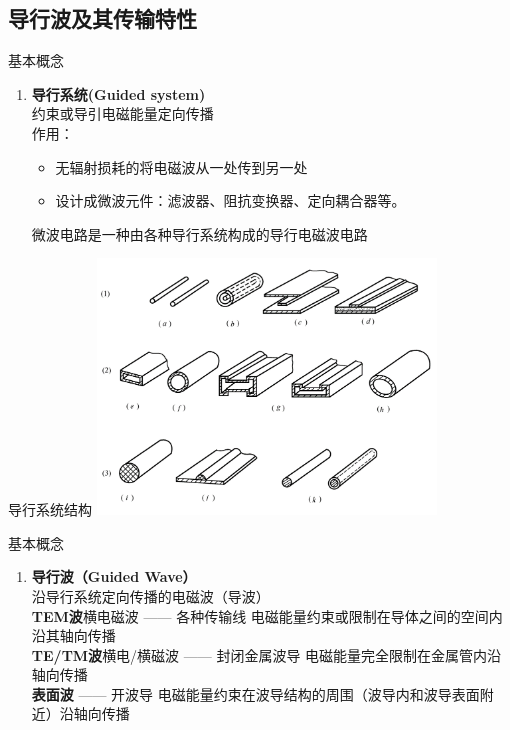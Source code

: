 \subsection{导行波及其传输特性}
\begin{frame}{基本概念}
 \begin{enumerate}
  \item \textbf{导行系统(Guided system)}
        \saveenum
        \\约束或导引电磁能量定向传播\\
        作用：\\
        \begin{itemize}
         \item 无辐射损耗的将电磁波从一处传到另一处
         \item 设计成微波元件：滤波器、阻抗变换器、定向耦合器等。
        \end{itemize}
        微波电路是一种由各种导行系统构成的导行电磁波电路
 \end{enumerate}

\end{frame}

\begin{frame}{导行系统结构}
 \centering
 \includegraphics[width=9cm]{guidesystem.png}
\end{frame}

\begin{frame}{基本概念}
 \begin{enumerate}
  \resume
  \item \textbf{导行波（Guided Wave）}
        \\沿导行系统定向传播的电磁波（导波）
        \\\textbf{TEM波}\quad 横电磁波 —— 各种传输线 电磁能量约束或限制在导体之间的空间内沿其轴向传播
        \\\textbf{TE/TM波}\quad 横电/横磁波 —— 封闭金属波导 电磁能量完全限制在金属管内沿轴向传播
        \\\textbf{表面波} —— 开波导 电磁能量约束在波导结构的周围（波导内和波导表面附近）沿轴向传播
        \saveenum
 \end{enumerate}
\end{frame}

